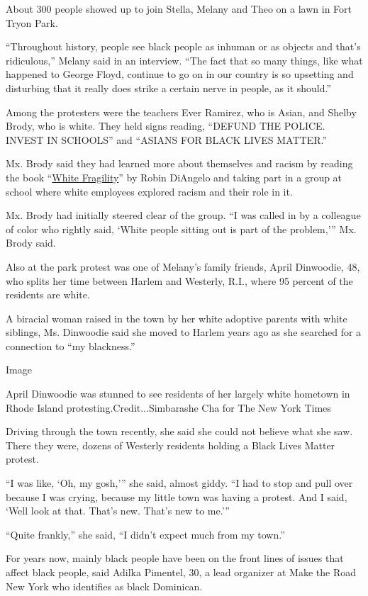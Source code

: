 About 300 people showed up to join Stella, Melany and Theo on a lawn in
Fort Tryon Park.

``Throughout history, people see black people as inhuman or as objects
and that's ridiculous,'' Melany said in an interview. ``The fact that so
many things, like what happened to George Floyd, continue to go on in
our country is so upsetting and disturbing that it really does strike a
certain nerve in people, as it should.''

Among the protesters were the teachers Ever Ramirez, who is Asian, and
Shelby Brody, who is white. They held signs reading, ``DEFUND THE
POLICE. INVEST IN SCHOOLS'' and ``ASIANS FOR BLACK LIVES MATTER.''

Mx. Brody said they had learned more about themselves and racism by
reading the book
``\href{https://www.nytimes3xbfgragh.onion/2020/07/15/magazine/white-fragility-robin-diangelo.html}{White
Fragility}'' by Robin DiAngelo and taking part in a group at school
where white employees explored racism and their role in it.

Mx. Brody had initially steered clear of the group. ``I was called in by
a colleague of color who rightly said, `White people sitting out is part
of the problem,''' Mx. Brody said.

Also at the park protest was one of Melany's family friends, April
Dinwoodie, 48, who splits her time between Harlem and Westerly, R.I.,
where 95 percent of the residents are white.

A biracial woman raised in the town by her white adoptive parents with
white siblings, Ms. Dinwoodie said she moved to Harlem years ago as she
searched for a connection to ``my blackness.''

Image

April Dinwoodie was stunned to see residents of her largely white
hometown in Rhode Island protesting.Credit...Simbarashe Cha for The New
York Times

Driving through the town recently, she said she could not believe what
she saw. There they were, dozens of Westerly residents holding a Black
Lives Matter protest.

``I was like, `Oh, my gosh,''' she said, almost giddy. ``I had to stop
and pull over because I was crying, because my little town was having a
protest. And I said, `Well look at that. That's new. That's new to
me.'''

``Quite frankly,'' she said, ``I didn't expect much from my town.''

For years now, mainly black people have been on the front lines of
issues that affect black people, said Adilka Pimentel, 30, a lead
organizer at Make the Road New York who identifies as black Dominican.

